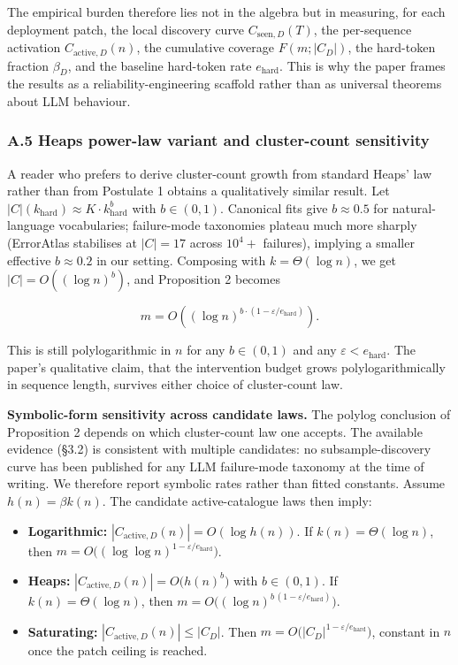 \documentclass[
]{article}
\providecommand{\tightlist}{%
  \setlength{\itemsep}{0pt}\setlength{\parskip}{0pt}}
\begin{document}
The empirical burden therefore lies not in the algebra but in measuring,
for each deployment patch, the local discovery curve
\(C_{\text{seen},D}(T)\), the per-sequence activation
\(C_{\text{active},D}(n)\), the cumulative coverage \(F(m; |C_D|)\), the
hard-token fraction \(\beta_D\), and the baseline hard-token rate
\(e_{\text{hard}}\). This is why the paper frames the results as a
reliability-engineering scaffold rather than as universal theorems about
LLM behaviour.

\subsubsection{A.5 Heaps power-law variant and cluster-count
sensitivity}\label{a.5-heaps-power-law-variant-and-cluster-count-sensitivity}

A reader who prefers to derive cluster-count growth from standard Heaps'
law rather than from Postulate 1 obtains a qualitatively similar result.
Let \(|C|(k_{\text{hard}}) \approx K \cdot k_{\text{hard}}^{b}\) with
\(b \in (0, 1)\). Canonical fits give \(b \approx 0.5\) for
natural-language vocabularies; failure-mode taxonomies plateau much more
sharply (ErrorAtlas stabilises at \(|C| = 17\) across \(10^4{+}\)
failures), implying a smaller effective \(b \approx 0.2\) in our
setting. Composing with \(k = \Theta(\log n)\), we get
\(|C| = O((\log n)^{b})\), and Proposition 2 becomes

\[
m = O\!\left((\log n)^{b \cdot (1 - \varepsilon / e_{\text{hard}})}\right).
\]

This is still polylogarithmic in \(n\) for any \(b \in (0, 1)\) and any
\(\varepsilon < e_{\text{hard}}\). The paper's qualitative claim, that
the intervention budget grows polylogarithmically in sequence length,
survives either choice of cluster-count law.

\textbf{Symbolic-form sensitivity across candidate laws.} The polylog
conclusion of Proposition 2 depends on which cluster-count law one
accepts. The available evidence (§3.2) is consistent with multiple
candidates: no subsample-discovery curve has been published for any LLM
failure-mode taxonomy at the time of writing. We therefore report
symbolic rates rather than fitted constants. Assume
\(h(n) = \beta k(n)\). The candidate active-catalogue laws then imply:

\begin{itemize}
\tightlist
\item
  \textbf{Logarithmic:} \(|C_{\text{active},D}(n)| = O(\log h(n))\). If
  \(k(n) = \Theta(\log n)\), then
  \(m = O\!\bigl((\log\log n)^{1 - \varepsilon / e_{\text{hard}}}\bigr)\).
\item
  \textbf{Heaps:} \(|C_{\text{active},D}(n)| = O\!\bigl(h(n)^b\bigr)\)
  with \(b \in (0, 1)\). If \(k(n) = \Theta(\log n)\), then
  \(m = O\!\bigl((\log n)^{b\,(1 - \varepsilon / e_{\text{hard}})}\bigr)\).
\item
  \textbf{Saturating:} \(|C_{\text{active},D}(n)| \leq |C_D|\). Then
  \(m = O\!\bigl(|C_D|^{1 - \varepsilon / e_{\text{hard}}}\bigr)\),
  constant in \(n\) once the patch ceiling is reached.
\end{itemize}
\end{document}
